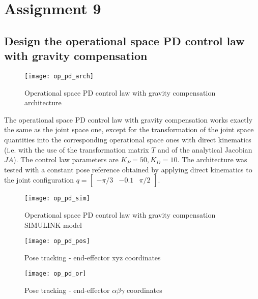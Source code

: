 \section{Assignment 9}

\subsection{Design the operational space PD control law with gravity compensation}

\begin{figure}[H]
\centering
\texttt{[image: op\_pd\_arch]}
\caption{Operational space PD control law with gravity compensation architecture}
\end{figure}

The operational space PD control law with gravity compensation works exactly the same as the joint space one, except for the transformation of the joint space quantities into the corresponding operational space ones with direct kinematics (i.e. with the use of the transformation matrix $T$ and of the analytical Jacobian $JA$). The control law parameters are $K_P=50,K_D=10$. The architecture was tested with a constant pose reference obtained by applying direct kinematics to the joint configuration $q=\begin{bmatrix}
-\pi/3&-0.1&\pi/2
\end{bmatrix}$.

\begin{figure}[H]
\centering
\texttt{[image: op\_pd\_sim]}
\caption{Operational space PD control law with gravity compensation SIMULINK model}
\end{figure}

\begin{figure}[H]
\begin{minipage}{0.5\textwidth}
\centering
\texttt{[image: op\_pd\_pos]}
\caption{Pose tracking - end-effector xyz coordinates}
\end{minipage}
\begin{minipage}{0.5\textwidth}
\centering
\texttt{[image: op\_pd\_or]}
\caption{Pose tracking - end-effector $\alpha\beta\gamma$ coordinates}
\end{minipage}
\end{figure}